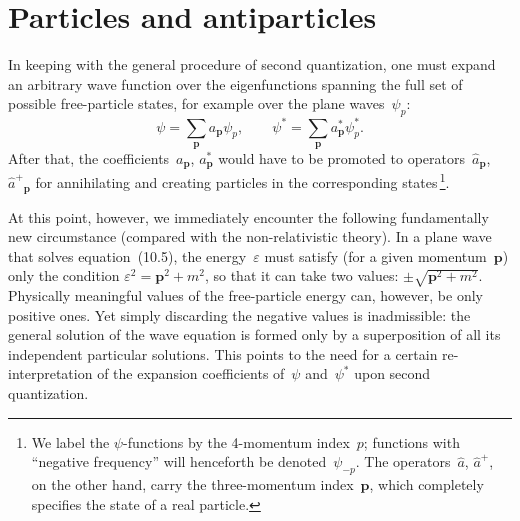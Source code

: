 \section{Particles and antiparticles}

In keeping with the general procedure of second quantization, one must expand an arbitrary wave function over the eigenfunctions spanning the full set of possible free-particle states, for example over the plane waves~$\psi_p$:
\[
\psi = \sum_\mathbf{p} a_\mathbf{p}\psi_p, \qquad \psi^* = \sum_\mathbf{p} a^*_\mathbf{p}\psi^*_p.
\]
After that, the coefficients~$a_\mathbf{p}$, $a^*_\mathbf{p}$ would have to be promoted to operators~$\hat{a}_\mathbf{p}$, $\hat{a}^+{}_\mathbf{p}$ for annihilating and creating particles in the corresponding states\,\footnote{We label the $\psi$-functions by the 4-momentum index~$p$; functions with ``negative frequency'' will henceforth be denoted~$\psi_{-p}$. The operators~$\hat{a}$, $\hat{a}^+$, on the other hand, carry the three-momentum index~$\mathbf{p}$, which completely specifies the state of a real particle.}.

At this point, however, we immediately encounter the following fundamentally new circumstance (compared with the non-relativistic theory). In a plane wave that solves equation~(10.5), the energy~$\varepsilon$ must satisfy (for a given momentum~$\mathbf{p}$) only the condition $\varepsilon^2 = \mathbf{p}^2 + m^2$, so that it can take two values: $\pm\sqrt{\mathbf{p}^2 + m^2}$. Physically meaningful values of the free-particle energy can, however, be only positive ones. Yet simply discarding the negative values is inadmissible: the general solution of the wave equation is formed only by a superposition of all its independent particular solutions. This points to the need for a certain re-
interpretation of the expansion coefficients of~$\psi$ and~$\psi^*$ upon second quantization.

